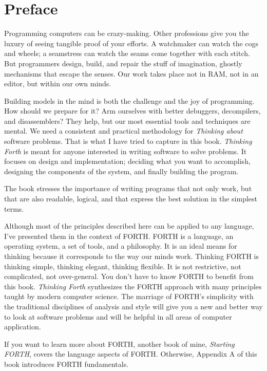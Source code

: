 \part*{Preface}

Programming computers can be crazy-making. Other professions give
you the luxury of seeing tangible proof of your efforts. A watchmaker
can watch the cogs and wheels; a seamstress can watch the seams come
together with each stitch. But programmers design, build, and repair
the stuff of imagination, ghostly mechanisms that escape the senses.
Our work takes place not in RAM, not in an editor, but within our
own minds.

Building models in the mind is both the challenge and the joy of programming.
How should we prepare for it? Arm ourselves with better debuggers,
decompilers, and disassemblers? They help, but our most essential
tools and techniques are mental. We need a consistent and practical
methodology for \emph{Thinking about} software problems. That is what
I have tried to capture in this book. \emph{Thinking Forth} is meant
for anyone interested in writing software to solve problems. It focuses
on design and implementation; deciding what you want to accomplish,
designing the components of the system, and finally building the program.

The book stresses the importance of writing programs that not only
work, but that are also readable, logical, and that express the best
solution in the simplest terms.

Although most of the principles described here can be applied to any
language, I've presented them in the context of FORTH. FORTH is a
language, an operating system, a set of tools, and a philosophy. It
is an ideal means for thinking because it corresponds to the way our
minds work. Thinking FORTH is thinking simple, thinking elegant, thinking
flexible. It is not restrictive, not complicated, not over-general.
You don't have to know FORTH to benefit from this book. \emph{Thinking
Forth} synthesizes the FORTH approach with many principles taught
by modern computer science. The marriage of FORTH's simplicity with
the traditional disciplines of analysis and style will give you a
new and better way to look at software problems and will be helpful
in all areas of computer application.

If you want to learn more about FORTH, another book of mine, \emph{Starting
FORTH}, covers the language aspects of FORTH. Otherwise, Appendix
A of this book introduces FORTH fundamentals.

